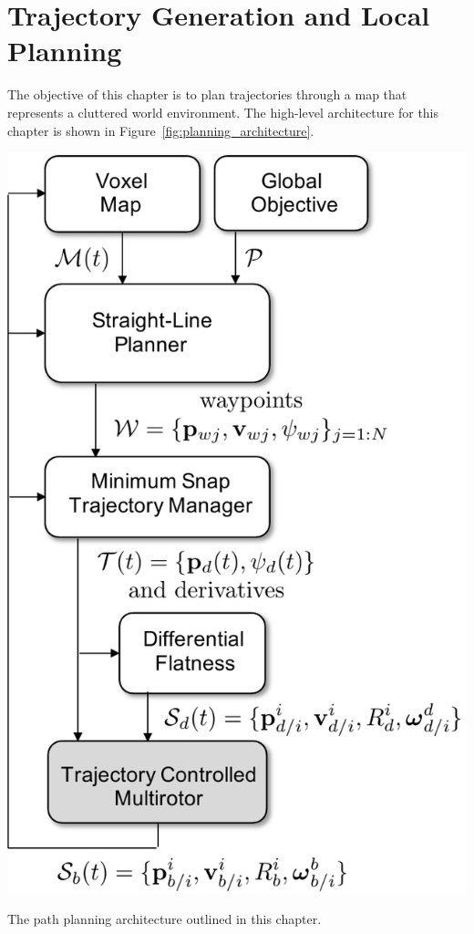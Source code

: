 \chapter{Trajectory Generation and Local Planning}
\label{chap:trajectory_planning}

The objective of this chapter is to plan trajectories through a map that represents a cluttered world environment.  The high-level architecture for this chapter is shown in Figure~\ref{fig:planning_architecture}.
\begin{marginfigure}[3in]
  \includegraphics[width=\linewidth]{chap5_trajectory_planning/figures/planning_architecture}
  \caption{The path planning architecture outlined in this chapter.}
  \label{fig:planning_architecture}  
\end{marginfigure}
